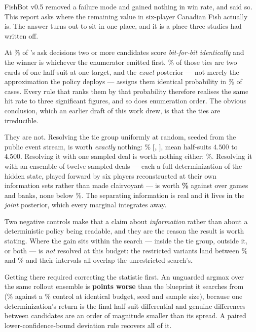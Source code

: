 FishBot v0.5 removed a failure mode and gained nothing in win rate, and said so. This report asks
where the remaining value in six-player Canadian Fish actually is. The answer turns out to sit in
one place, and it is a place three studies had written off.

At \vsixTieShareFive\% of \vfive{}'s ask decisions two or more candidates score \emph{bit-for-bit
identically} and the winner is whichever the enumerator emitted first. \vsixTieSameSuitFive\% of
those ties are two cards of one half-suit at one target, and the \emph{exact} posterior --- not
merely the approximation the policy deploys --- assigns them identical probability in
\vsixTieExactSepPctFive\% of cases. Every rule that ranks them by that probability therefore
realises the same hit rate to three significant figures, and so does enumeration order. The obvious
conclusion, which an earlier draft of this work drew, is that the ties are irreducible.

They are not. Resolving the tie group uniformly at random, seeded from the public event stream, is
worth \emph{exactly} nothing: \vsixSearchTieRandom\% [\vsixSearchTieRandomLo,
\vsixSearchTieRandomHi], mean half-suits $4.500$ to $4.500$. Resolving it with one sampled deal is
worth nothing either: \vsixSearchTieOnlyOne\%. Resolving it with an ensemble of twelve sampled
deals --- each a full determinization of the hidden state, played forward by six players
reconstructed at their own information sets rather than made clairvoyant --- is worth
\textbf{\vsixSearchPooled\%} against \vfive{} over \vsixSearchPooledN{} games and
\vsixSearchPooledBanks{} banks, none below \vsixSearchPooledMin\%. The separating information is
real and it lives in the \emph{joint} posterior, which every marginal integrates away.

Two negative controls make that a claim about \emph{information} rather than about a deterministic
policy being readable, and they are the reason the result is worth stating. Where the gain sits
within the search --- inside the tie group, outside it, or both --- is \emph{not} resolved at this
budget: the restricted variants land between \vsixSearchTieGuardedWin\% and
\vsixTieSearchMean\% and their intervals all overlap the unrestricted search's.

Getting there required correcting the statistic first. An unguarded argmax over the same rollout
ensemble is \textbf{\vsixCurseGap{} points worse} than the blueprint it searches from
(\vsixSearchUnguarded\% against a \vsixSearchControl\% control at identical budget, seed and sample
size), because one determinization's return is the final half-suit differential and genuine
differences between candidates are an order of magnitude smaller than its spread. A paired
lower-confidence-bound deviation rule recovers all of it.

